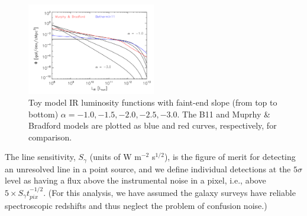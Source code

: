 \documentclass[12pt,preprint]{emulateapj}
\begin{document}
\begin{figure}
\centering
\includegraphics[width=0.5\textwidth]{phi_lir_schechter_bethermin11_murphy_Lstar1d12_Lmin1d8_Lmax1d13}
\caption{Toy model IR luminosity functions with faint-end slope (from top to bottom) $\alpha=-1.0, -1.5, -2.0, -2.5, -3.0$. The B11 and Muprhy \& Bradford models are plotted as blue and red curves, respectively, for comparison.}
\label{fig:schechterfuncs}

\end{figure}

The line sensitivity, $S_{\gamma}$ (units of W m$^{-2}$ s$^{1/2}$), is the figure of merit for detecting an unresolved line in a point source, and we define individual detections at the $5\sigma$ level as having a flux above the instrumental noise in a pixel, i.e., above $5 \times S_{\gamma} t_{pix}^{-1/2}$. (For this analysis, we have assumed the galaxy surveys have reliable spectroscopic redshifts and thus neglect the problem of confusion noise.) %
 
 
\end{document}
